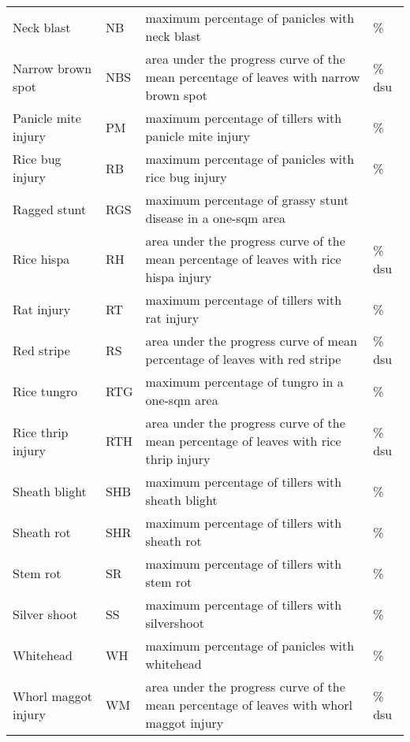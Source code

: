 \begin{landscape}
\begin{table}[!h]
\begin{tabular}{llll}
Neck blast            & NB      & maximum percentage of panicles with neck blast                                            & \%     \\
Narrow brown spot     & NBS     & area under the progress curve of the mean percentage of leaves with narrow brown spot     & \% dsu \\
Panicle mite  injury          & PM      & maximum percentage of tillers with panicle mite injury                                    & \%     \\
Rice bug injury       & RB      & maximum percentage of panicles with rice bug injury                                       & \%     \\
Ragged stunt     & RGS     & maximum percentage of grassy stunt disease in a one-sqm area                              &        \\
Rice hispa            & RH      & area under the progress curve of the mean percentage of leaves with rice hispa injury     & \% dsu \\
Rat injury            & RT      & maximum percentage of tillers with rat injury                                             & \%     \\
Red stripe            & RS      & area under the progress curve of mean percentage of leaves with red stripe                & \% dsu \\
Rice tungro           & RTG     & maximum percentage of tungro in a one-sqm area                                            & \%     \\
Rice thrip injury           & RTH     & area under the progress curve of the mean percentage of leaves with rice thrip injury     & \% dsu \\
Sheath blight         & SHB     & maximum percentage of tillers with sheath blight                                          & \%     \\
Sheath rot            & SHR     & maximum percentage of tillers with sheath rot                                             & \%     \\
Stem rot              & SR      & maximum percentage of tillers with stem rot                                               & \%     \\
Silver shoot          & SS      & maximum percentage of tillers with silvershoot                                            & \%     \\
Whitehead             & WH      & maximum percentage of panicles with whitehead                                             & \%     \\
Whorl maggot injury         & WM      & area under the progress curve of the mean percentage of leaves with whorl maggot injury   & \% dsu \\
\hline
\end{tabular}
\end{table}
\end{landscape}